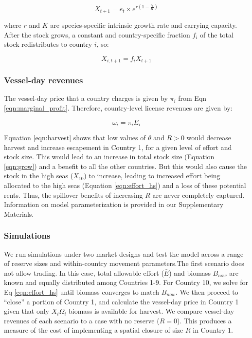 \documentclass[12pt]{article}
\begin{document}
\begin{equation}
X_{t+1} = e_t \times  e^{r \left(1 - \frac{e_t}{K} \right)}
\label{eqn:grow}
\end{equation}

\noindent where $r$ and $K$ are species-specific intrinsic growth rate and carrying capacity. After the stock grows, a constant and country-specific fraction $f_i$ of the total stock redistributes to country $i$, so:

\begin{equation}
X_{i,t+1} = f_iX_{t+1}
\label{eqn:disperse}
\end{equation}

\subsubsection{Vessel-day revenues}

The vessel-day price that a country charges is given by $\pi_i$ from Eqn \ref{eqn:marginal_profit}. Therefore, country-level license revenues are given by:

\begin{equation}
\omega_i = \pi_iE_i
\label{eqn:license_revenue}
\end{equation}

\noindent Equation \ref{eqn:harvest} shows that low values of $\theta$ and $R > 0$ would decrease harvest and increase escapement in Country 1, for a given level of effort and stock size. This would lead to an increase in total stock size (Equation \ref{eqn:grow}) and a benefit to all the other countries. But this would also cause the stock in the high seas ($X_{10}$) to increase, leading to increased effort being allocated to the high seas (Equation \ref{eqn:effort_hs}) and a loss of these potential rents. Thus, the spillover benefits of increasing $R$ are never completely captured. Information on model parameterization is provided in our Supplementary Materials.

\subsubsection{Simulations}

We run simulations under two market designs and test the model across a range of reserve sizes and within-country movement parameters.The first scenario does not allow trading. In this case, total allowable effort ($\bar{E}$) and biomass $B_{now}$ are known and equally distributed among Countries 1-9. For Country 10, we solve for Eq \ref{eqn:effort_hs} until biomass converges to match $B_{now}$. We then proceed to ``close'' a portion of Country 1, and calculate the vessel-day price in Country 1 given that only $X_i\Omega_i$ biomass is available for harvest. We compare vessel-day revenues of each scenario to a case with no reserve ($R = 0$). This produces a measure of the cost of implementing a spatial closure of size $R$ in Country 1.
\end{document}
